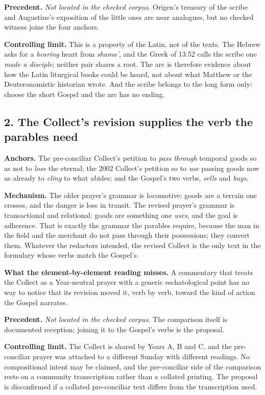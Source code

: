 \textbf{Precedent.} \emph{Not located in the checked corpus.} Origen's treasury of the scribe and Augustine's exposition of the little ones are near analogues, but no checked witness joins the four anchors.

\textbf{Controlling limit.} This is a property of the Latin, not of the texts. The Hebrew asks for a \emph{hearing} heart from \emph{shama'}, and the Greek of 13:52 calls the scribe one \emph{made a disciple}; neither pair shares a root. The arc is therefore evidence about how the Latin liturgical books could be heard, not about what Matthew or the Deuteronomistic historian wrote. And the scribe belongs to the long form only: choose the short Gospel and the arc has no ending.

\subsection*{2. The Collect's revision supplies the verb the parables need}

\textbf{Anchors.} The pre-conciliar Collect's petition to \emph{pass through} temporal goods so as not to \emph{lose} the eternal; the 2002 Collect's petition so to \emph{use} passing goods now as already to \emph{cling} to what abides; and the Gospel's two verbs, \emph{sells} and \emph{buys}.

\textbf{Mechanism.} The older prayer's grammar is locomotive: goods are a terrain one crosses, and the danger is loss in transit. The revised prayer's grammar is transactional and relational: goods are something one \emph{uses}, and the goal is adherence. That is exactly the grammar the parables require, because the man in the field and the merchant do not pass through their possessions; they convert them. Whatever the redactors intended, the revised Collect is the only text in the formulary whose verbs match the Gospel's.

\textbf{What the element-by-element reading misses.} A commentary that treats the Collect as a Year-neutral prayer with a generic eschatological point has no way to notice that its revision moved it, verb by verb, toward the kind of action the Gospel narrates.

\textbf{Precedent.} \emph{Not located in the checked corpus.} The comparison itself is documented reception; joining it to the Gospel's verbs is the proposal.

\textbf{Controlling limit.} The Collect is shared by Years A, B and C, and the pre-conciliar prayer was attached to a different Sunday with different readings. No compositional intent may be claimed, and the pre-conciliar side of the comparison rests on a community transcription rather than a collated printing. The proposal is disconfirmed if a collated pre-conciliar text differs from the transcription used.

